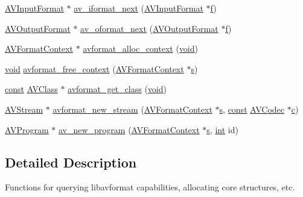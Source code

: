 \begin{DoxyCompactItemize}
\item 
\hyperlink{struct_a_v_input_format}{A\+V\+Input\+Format} $\ast$ \hyperlink{group__lavf__core_ga5a9e27c9e2b04abcf6ed2e0f9b68da4f}{av\+\_\+iformat\+\_\+next} (\hyperlink{struct_a_v_input_format}{A\+V\+Input\+Format} $\ast$\hyperlink{checksum_8c_ae747d72a1a803f5ff4a4b2602857d93b}{f})
\item 
\hyperlink{struct_a_v_output_format}{A\+V\+Output\+Format} $\ast$ \hyperlink{group__lavf__core_ga9c169031f490901218b1e6bcd9993967}{av\+\_\+oformat\+\_\+next} (\hyperlink{struct_a_v_output_format}{A\+V\+Output\+Format} $\ast$\hyperlink{checksum_8c_ae747d72a1a803f5ff4a4b2602857d93b}{f})
\item 
\hyperlink{struct_a_v_format_context}{A\+V\+Format\+Context} $\ast$ \hyperlink{group__lavf__core_gac7a91abf2f59648d995894711f070f62}{avformat\+\_\+alloc\+\_\+context} (\hyperlink{sound_8c_ae35f5844602719cf66324f4de2a658b3}{void})
\item 
\hyperlink{sound_8c_ae35f5844602719cf66324f4de2a658b3}{void} \hyperlink{group__lavf__core_gac2990b13b68e831a408fce8e1d0d6445}{avformat\+\_\+free\+\_\+context} (\hyperlink{struct_a_v_format_context}{A\+V\+Format\+Context} $\ast$\hyperlink{lib_2expat_8h_a755339d27872b13735c2cab829e47157}{s})
\item 
\hyperlink{getopt1_8c_a2c212835823e3c54a8ab6d95c652660e}{const} \hyperlink{struct_a_v_class}{A\+V\+Class} $\ast$ \hyperlink{group__lavf__core_ga6030789ce395ef543306bbe933619749}{avformat\+\_\+get\+\_\+class} (\hyperlink{sound_8c_ae35f5844602719cf66324f4de2a658b3}{void})
\item 
\hyperlink{struct_a_v_stream}{A\+V\+Stream} $\ast$ \hyperlink{group__lavf__core_gadcb0fd3e507d9b58fe78f61f8ad39827}{avformat\+\_\+new\+\_\+stream} (\hyperlink{struct_a_v_format_context}{A\+V\+Format\+Context} $\ast$\hyperlink{lib_2expat_8h_a755339d27872b13735c2cab829e47157}{s}, \hyperlink{getopt1_8c_a2c212835823e3c54a8ab6d95c652660e}{const} \hyperlink{struct_a_v_codec}{A\+V\+Codec} $\ast$\hyperlink{rfft2d_test_m_l_8m_ae0323a9039add2978bf5b49550572c7c}{c})
\item 
\hyperlink{struct_a_v_program}{A\+V\+Program} $\ast$ \hyperlink{group__lavf__core_gab31f7c7c99dcadead38e8e83e0fdb828}{av\+\_\+new\+\_\+program} (\hyperlink{struct_a_v_format_context}{A\+V\+Format\+Context} $\ast$\hyperlink{lib_2expat_8h_a755339d27872b13735c2cab829e47157}{s}, \hyperlink{xmltok_8h_a5a0d4a5641ce434f1d23533f2b2e6653}{int} id)
\end{DoxyCompactItemize}


\subsection{Detailed Description}
Functions for querying libavformat capabilities, allocating core structures, etc. 

